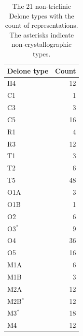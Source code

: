 \documentclass[preprint]{iucr}              %
\begin{document}
\begin{table}
\caption{The 21 non-triclinic Delone types with the count of representations.
The asterisks indicate non-crystallographic types.}
\label{table:TypeCounts}
\begin{tabular}{lr}
Delone type & Count    \\
\hline
H4&12\\
C1&1\\
C3&3\\
C5&16\\
R1&4\\
R3&12\\
T1&3\\
T2&6\\
T5&48\\
O1A&3\\
O1B&1\\
O2&6\\
O3$^*$&9\\
O4&36\\
O5&16\\
M1A&6\\
M1B&3\\
M2A&12\\
M2B$^*$&12\\
M3$^*$&18\\
M4&12\\
\bottomrule
\end{tabular}
\end{table}
    
\end{document}
